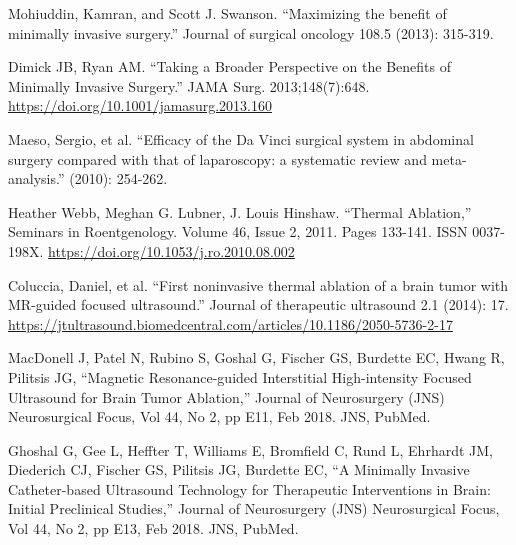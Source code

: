 \documentclass[12pt]{report}
\makeatletter
\renewcommand{\todo}[2][]{%
    \@todo[caption={#2}, #1]{\begin{spacing}{0.5}#2\end{spacing}}%
}
\makeatother
\begin{document}
%
%
%
\todo[inline]{Get bibliography to show up in TOC.}
\begin{thebibliography}{99}

 Mohiuddin, Kamran, and Scott J. Swanson. ``Maximizing the benefit of minimally invasive surgery.'' Journal of surgical oncology 108.5 (2013): 315-319.

 Dimick JB, Ryan AM. ``Taking a Broader Perspective on the Benefits of Minimally Invasive Surgery.'' JAMA Surg. 2013;148(7):648. \url{https://doi.org/10.1001/jamasurg.2013.160}

 Maeso, Sergio, et al. ``Efficacy of the Da Vinci surgical system in abdominal surgery compared with that of laparoscopy: a systematic review and meta-analysis.'' (2010): 254-262.

 Heather Webb, Meghan G. Lubner, J. Louis Hinshaw. ``Thermal Ablation,'' Seminars in Roentgenology. Volume 46, Issue 2, 2011. Pages 133-141. ISSN 0037-198X. \url{https://doi.org/10.1053/j.ro.2010.08.002}

 Coluccia, Daniel, et al. ``First noninvasive thermal ablation of a brain tumor with MR-guided focused ultrasound.'' Journal of therapeutic ultrasound 2.1 (2014): 17. \url{https://jtultrasound.biomedcentral.com/articles/10.1186/2050-5736-2-17}

 MacDonell J, Patel N, Rubino S, Goshal G, Fischer GS, Burdette EC, Hwang R, Pilitsis JG, ``Magnetic Resonance-guided Interstitial High-intensity Focused Ultrasound for Brain Tumor Ablation,'' Journal of Neurosurgery (JNS) Neurosurgical Focus, Vol 44, No 2, pp E11, Feb 2018. JNS, PubMed.

 Ghoshal G, Gee L, Heffter T, Williams E, Bromfield C, Rund L, Ehrhardt JM, Diederich CJ, Fischer GS, Pilitsis JG, Burdette EC, ``A Minimally Invasive Catheter-based Ultrasound Technology for Therapeutic Interventions in Brain: Initial Preclinical Studies,'' Journal of Neurosurgery (JNS) Neurosurgical Focus, Vol 44, No 2, pp E13, Feb 2018. JNS, PubMed.


\end{thebibliography}
\end{document}
